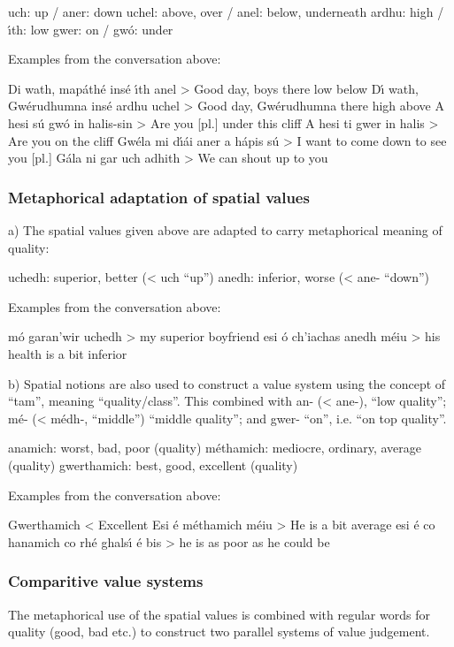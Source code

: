         uch: up                     / aner: down
        uchel: above, over    / anel: below, underneath
        ardhu: high              / \'{\i}th: low
        gwer: on                    / gw\'{o}: under

Examples from the conversation above:

Di wath, map\'{a}th\'{e} ins\'{e} \'{\i}th anel > Good day, boys there low below
D\'{\i} wath, Gw\'{e}rudhumna ins\'{e} ardhu uchel > Good day, Gw\'{e}rudhumna there high above 
A hesi s\'{u} gw\'{o} in halis-sin > Are you [pl.] under this cliff
A hesi ti gwer in halis > Are you on the cliff
Gw\'{e}la mi d\'{\i}\'{a}i aner a h\'{a}pis s\'{u} > I want to come down to see you [pl.]
G\'{a}la ni gar uch adhith > We can shout up to you


\subsubsection{Metaphorical adaptation of spatial values}

a) The spatial values given above are adapted to carry metaphorical meaning of quality:

        uchedh: superior, better (< uch “up”)
         anedh: inferior, worse (< ane- “down”)

Examples from the conversation above:

m\'{o} garan’wir uchedh > my superior boyfriend
esi \'{o} ch’iachas anedh m\'{e}iu > his health is a bit inferior

b) Spatial notions are also used to construct a value system using the concept of “tam”, meaning “quality/class”. This combined with an- (< ane-), “low quality”; m\'{e}- (< m\'{e}dh-, “middle”) “middle quality”; and gwer- “on”, i.e. “on top quality”.

         anamich: worst, bad, poor (quality) 
        m\'{e}thamich: mediocre, ordinary, average (quality) 
        gwerthamich: best, good, excellent (quality) 

Examples from the conversation above:

Gwerthamich < Excellent
Esi \'{e} m\'{e}thamich m\'{e}iu > He is a bit average
esi \'{e} co hanamich co rh\'{e} ghals\'{\i} \'{e} bis > he is as poor as he could be


\subsubsection{Comparitive value systems}

The metaphorical use of the spatial values is combined with regular words for quality (good, bad etc.) to construct two parallel systems of value judgement. 

